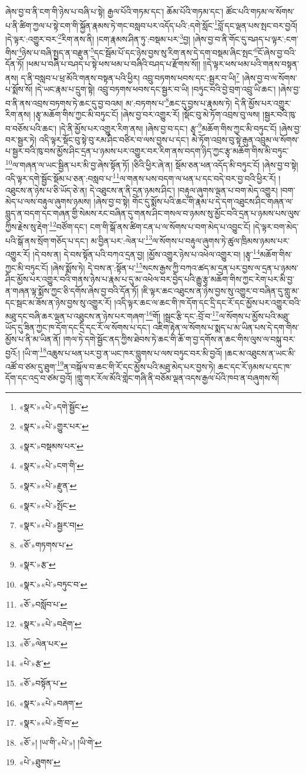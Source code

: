 ཞེས་བྱ་བ་ནི་ངག་གི་ཉེས་པ་བཞི་པ་སྟེ། རྒྱལ་པོའི་གཏམ་དང་། ཆོམ་པོའི་གཏམ་དང་། ཚོང་པའི་གཏམ་ལ་སོགས་པ་ནི་ཚིག་ཀྱལ་པ་སྟེ་ངག་གི་སྐྱོན་རྣམས་ཏེ་གང་བསླབ་པར་འདོད་པའི་:དགེ་སློང་\footnote{«སྣར་»«པེ་»དགེ་སྦྱོང་}བློ་དང་ལྡན་པས་སྤང་བར་བྱའོ། །དེ་ལྟར་:འགྱུར་བར་\footnote{«སྣར་»«པེ་»གྱུར་པར་}རིག་ནས་ནི། །ངག་རྣམས་ཤིན་ཏུ་:བསྡམ་པར་\footnote{«སྣར་»བསྡམས་པར་}བྱ། །ཞེས་བྱ་བ་ནི་གོང་དུ་བཤད་པ་ལྟར་:ངག་གིས་\footnote{«སྣར་»«པེ་»ངག་གི་}ཉེས་པ་བཞི་སྤྱད་ན་བརྫུན་\footnote{«སྣར་»«པེ་»རྫུན་}དང་སྦོམ་པོ་དང་ཉེས་བྱས་སུ་རིག་ནས་དེ་དག་བསྡམ་ཞིང་སྤང་\footnote{«སྣར་»«པེ་»སྤོང་}ངོ་ཞེས་བྱ་བའི་དོན་ཏོ། །ཕམ་པ་བཞི་པ་བཤད་པ་སྟེ་ཕས་ཕམ་པ་བཞིའི་བཤད་པ་རྫོགས་སོ།། །།དེ་ལྟར་ཕས་ཕམ་པའི་གནས་བསྟན་ནས། ད་ནི་བསླབ་པ་ཕྲ་མོའི་གནས་བསྟན་པའི་ཕྱིར། འབྲུ་བཏགས་ཕབས་དང་:སྦྱར་བ་ཡི།\footnote{«སྣར་»«པེ་»སྦྱར་བ།} །ཞེས་བྱ་བ་ལ་སོགས་པ་སྨོས་སོ། །དེ་ཡང་རྣམ་པ་དྲུག་སྟེ། འབྲུ་བཏགས་ཕབས་དང་སྦྱར་བ་ཡི། །བཏུང་བའི་བྱེ་བྲག་འབྲུ་ཡི་ཆང་། །ཞེས་བྱ་བ་ནི་ནས་འབྲས་བཏགས་ཏེ་ཆང་དུ་བྱ་བའམ། མ་:བཏགས་པ་\footnote{«ཅོ་»གཏགས་པ་}ཆང་དུ་བྱས་པ་རྣམས་ཏེ། དེ་ནི་མྱོས་པར་འགྱུར་རིག་ནས། །རྩྭ་མཆོག་གིས་ཀྱང་མི་བཏུང་ངོ། །ཞེས་བྱ་བར་འགྱུར་རོ། །སྡོང་བུ་མེ་ཏོག་འབྲས་བུ་ལས། །སྦྱར་བའི་ཁུ་བ་བཅོས་པའི་ཆང་། །དེ་ནི་མྱོས་པར་འགྱུར་རིག་ནས། །ཞེས་བྱ་བ་དང་། རྩྭ་\footnote{«སྣར་»རྩ་}མཆོག་གིས་ཀྱང་མི་བཏུང་ངོ། །ཞེས་བྱ་བར་སྦྱར་ཏེ། འདི་ལྟར་སྡོང་བུ་སྟེ་བུ་རམ་ཤིང་བཙིར་བ་ལས་བྱས་པ་དང་། མེ་ཏོག་འབྲས་བུ་སྟེ་རྒུན་འབྲུམ་ལ་སོགས་པ་སྦྱར་བའི་ཁུ་བས་མྱོས་ཤིང་དྲན་པ་ཉམས་པར་འགྱུར་བར་རིག་ནས་བདག་ཉིད་ཀྱང་རྩྭ་མཆོག་གིས་མི་བཏུང་\footnote{«སྣར་»«པེ་»བཏུང་བ་}ལ་གཞན་ལ་ཡང་སྦྱིན་པར་མི་བྱ་ཞེས་སྟོན་ཏོ། །ཅིའི་ཕྱིར་ཞེ་ན། སྡོམ་ཅན་ཕན་འདོད་མི་བཏུང་ངོ། །ཞེས་བྱ་བ་སྟེ། འདི་ལྟར་དགེ་སྦྱོང་སྡོམ་པ་ཅན་:བསླབ་པ་\footnote{«ཅོ་»བསློབ་པ་}ལ་གནས་པས་བདག་ལ་ཕན་པ་དང་བདེ་བར་བྱ་བའི་ཕྱིར་རོ། །འཐུངས་ན་ཉེས་པ་ཅི་ཡོད་ཅེ་ན། དེ་འཐུངས་ན་ནི་དྲན་ཉམས་ཤིང་། །བརྟུལ་ཞུགས་ལྡན་པ་བག་མེད་འགྱུར། །བག་མེད་པ་ལས་བརྟུལ་ཞུགས་ཉམས། །ཞེས་བྱ་བ་སྟེ། གོང་དུ་སྨོས་པའི་ཆང་གི་རྣམ་པ་དེ་དག་འཐུངས་ཤིང་གཞན་ལ་བླུད་ན་བདག་དང་གཞན་གྱི་སེམས་རང་བཞིན་དུ་གནས་ཤིང་གསལ་བ་ཉམས་སུ་མྱོང་བའི་དྲན་པ་ཉམས་པས་ལུས་ཀྱིས་རྗེས་སུ་རྡེག་\footnote{«སྣར་»«པེ་»བརྡེག་}བཙོག་དང་། ངག་གི་སྒོ་ནས་ཚིག་ངན་པ་ལ་སོགས་པ་བག་མེད་པ་འབྱུང་ངོ། །དེ་ལྟར་བག་མེད་པའི་སྒོ་ནས་སྲོག་གཅོད་པ་དང་། མ་བྱིན་པར་:ལེན་པ་\footnote{«ཅོ་»ལེན་པར་}ལ་སོགས་པ་བརྟུལ་ཞུགས་ཏེ་ཚུལ་ཁྲིམས་ཉམས་པར་འགྱུར་རོ། །དེ་བས་ན། དེ་བས་སྟོན་པའི་བཀའ་དྲན་བྱ། །མྱོས་འགྱུར་ཉེས་པ་འཕེལ་འགྱུར་བ། །རྩྭ་\footnote{«པེ་»རྩ་}མཆོག་གིས་ཀྱང་མི་བཏུང་ངོ། །ཞེས་སྨོས་ཏེ། དེ་བས་ན་:སྟོན་པ་\footnote{«ཅོ་»བསྟོན་པ་}སངས་རྒྱས་ཀྱི་བཀའ་ཚད་མ་དྲན་པར་བྱས་ལ་དྲན་པ་ཉམས་ཤིང་མྱོས་པར་འགྱུར་བའི་གནས་ཉེས་པ་རྣམ་པ་དུ་མ་འཕེལ་བར་བྱེད་པའི་རྒྱུ་རྩྭ་མཆོག་གིས་ཀྱང་རེག་པར་མི་བྱ་ན་གཞན་ལྟ་སྨོས་ཀྱང་ཅི་དགོས་ཞེས་བྱ་བའི་དོན་ཏོ། །ཇི་ལྟར་ཆང་འཐུངས་ན་ཉེས་བྱས་སུ་འགྱུར་བ་བཞིན་དུ་གླུ་མ་དང་སྦང་མ་ཟོས་ན་ཉེས་བྱས་སུ་འགྱུར་རོ། །འདི་ལྟར་ཆང་ལ་ཆང་གི་ཁ་དོག་དང་དྲི་དང་རོ་དང་མྱོས་པར་འགྱུར་བའི་མཐུ་དང་བཞི་ཆར་ལྡན་པ་འཐུངས་ན་ཉེས་པར་གཞག་\footnote{«སྣར་»«པེ་»བཞག་}གོ། །སྦྲང་རྩི་དང་:བྲོ་བ་\footnote{«སྣར་»«པེ་»གྲོ་བ་}ལ་སོགས་པ་མྱོས་པའི་མཐུ་ཡོད་དུ་ཟིན་ཀྱང་ཁ་དོག་དང་དྲི་དང་རོ་ལ་སོགས་པ་དང་། འཇིག་རྟེན་ལ་སོགས་པ་སྨད་པ་མ་ཡིན་པས་དེ་དག་གིས་མྱོས་པ་ནི་མ་ཡིན་ནོ། །གལ་ཏེ་དགེ་སྦྱོང་ནད་ཀྱིས་ཐེབས་ཏེ་ཆང་གི་ཆོ་ག་བྱ་དགོས་ན་ཆང་གིས་ལུས་ལ་བསྐུ་བར་བྱའོ:། །ཡི་ག་\footnote{«ཅོ་»། །ཡ་གི་«པེ་»། །ཡི་གེ་}འཆུས་པ་ཕན་པར་བྱ་ན་ཡང་ཁར་བླུགས་པ་ལས་བཏུང་བར་མི་བྱའོ། །ཆང་མ་འཐུངས་ན་ཡང་མི་འཚོ་བ་ཙམ་དུ་ཐུག་\footnote{«པེ་»ཐུགས་}ན་བསྐོལ་བ་ཆང་གི་རོ་དང་མྱོས་པའི་མཐུ་མེད་པར་བྱས་ཏེ། ཆང་དང་རོ་ཉམས་པ་དང་ཁ་དོག་དང་འདྲ་བ་ཙམ་བྱའོ། །གླུ་གར་རོལ་མོའི་གླེང་གཞི་ནི་བཅོམ་ལྡན་འདས་རྒྱལ་པོའི་ཁབ་ན་བཞུགས་སོ། 